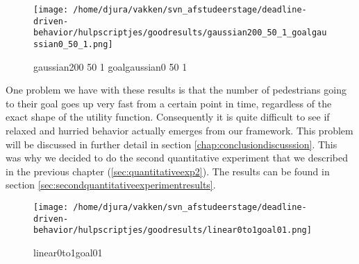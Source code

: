 \documentclass[11pt]{book}
\begin{document}
\begin{figure}[h]
\centering
\texttt{[image: /home/djura/vakken/svn\_afstudeerstage/deadline-driven-behavior/hulpscriptjes/goodresults/gaussian200\_50\_1\_goalgaussian0\_50\_1.png]}
\caption{gaussian200 50 1 goalgaussian0 50 1}
\label{fig:gaussian200_50_1_goalgaussian0_50_1}
\end{figure}

One problem we have with these results is that the number of pedestrians going to their goal goes up very fast from a certain point in time, regardless of the exact shape of the utility function. Consequently it is quite difficult to see if relaxed and hurried behavior actually emerges from our framework. This problem will be discussed in further detail in section \ref{chap:conclusiondiscusssion}. This was why we decided to do the second quantitative experiment that we described in the previous chapter (\ref{sec:quantitativeexp2}). The results can be found in section \ref{sec:secondquantitativeexperimentresults}.


\begin{figure}[h]
\centering
\texttt{[image: /home/djura/vakken/svn\_afstudeerstage/deadline-driven-behavior/hulpscriptjes/goodresults/linear0to1goal01.png]}
\caption{linear0to1goal01}
\label{fig:linear0to1goal01}
\end{figure}


\clearpage
\end{document}
